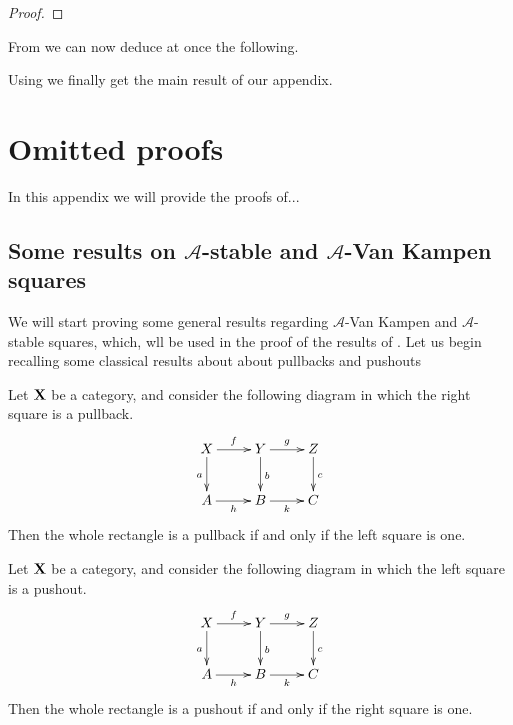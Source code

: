 \documentclass[a4paper,UKenglish,cleveref,pdftex, thm-restate,numberwithinsect]{lipics}
\def\X{\textbf {\textup{X}}}
\begin{document}
\begin{lemma}\label{lem:prop} 
\end{lemma}
\begin{proof}
	\qedhere 
\end{proof}


\begin{definition}
\end{definition}

\begin{remark}
\end{remark}

From  we can now deduce at once the following.
\begin{corollary}
\end{corollary}

Using  we finally get the main result of our appendix.
\begin{corollary}
\end{corollary}



\section{Omitted proofs}
In this appendix we will provide the proofs of...

\subsection{Some results on $\mathcal{A}$-stable and $\mathcal{A}$-Van Kampen squares}
We will start proving some general results regarding $\mathcal{A}$-Van Kampen and $\mathcal{A}$-stable squares, which, wll be used in the proof of the results of . Let us begin recalling some classical results about  about pullbacks and pushouts

\begin{lemma}\label{lem:popb1} \label{lem:pb1}
	Let $\X$ be a category, and consider the following diagram 	in which the right square is a pullback.
	\[\xymatrix{X \ar[d]_{a} \ar[r]^{f}& \ar[r]^{g} Y \ar[d]^{b}& Z \ar[d]^{c}\\ A \ar[r]_{h}& B \ar[r]_{k}& C}\]
	Then the whole rectangle is a pullback if and only if the left square is one.
\end{lemma}

\begin{lemma}\label{lem:po1}
	Let $\X$ be a category, and consider the following diagram 	in which the left square is a pushout.
	\[\xymatrix{X \ar[d]_{a} \ar[r]^{f}& \ar[r]^{g} Y \ar[d]^{b}& Z \ar[d]^{c}\\ A \ar[r]_{h}& B \ar[r]_{k}& C}\]
	Then the whole rectangle is a pushout if and only if the right square is one.
\end{lemma}
\end{document}
